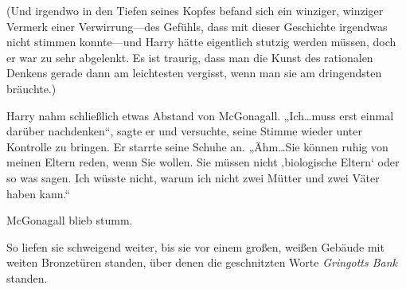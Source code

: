 (Und irgendwo in den Tiefen seines Kopfes befand sich ein winziger, winziger Vermerk einer Verwirrung—des Gefühls, dass mit dieser Geschichte irgendwas nicht stimmen konnte—und Harry hätte eigentlich stutzig werden müssen, doch er war zu sehr abgelenkt. Es ist traurig, dass man die Kunst des rationalen Denkens gerade dann am leichtesten vergisst, wenn man sie am dringendsten bräuchte.)

Harry nahm schließlich etwas Abstand von McGonagall.
„Ich…muss erst einmal darüber nachdenken“, sagte er und versuchte, seine Stimme wieder unter Kontrolle zu bringen. Er starrte seine Schuhe an. „Ähm…Sie können ruhig von meinen Eltern reden, wenn Sie wollen. Sie müssen nicht ‚biologische Eltern‘ oder so was sagen. Ich wüsste nicht, warum ich nicht zwei Mütter und zwei Väter haben kann.“

McGonagall blieb stumm.

So liefen sie schweigend weiter, bis sie vor einem großen, weißen Gebäude mit weiten Bronzetüren standen, über denen die geschnitzten Worte \emph{Gringotts Bank} standen.

